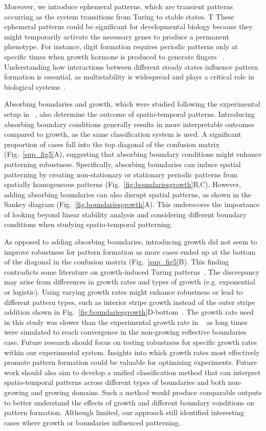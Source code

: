 Moreover, we introduce ephemeral patterns, which are transient patterns occurring as the system transitions from Turing to stable states.
T These ephemeral patterns could be significant for developmental biology because they might temporarily activate the necessary genes to produce a permanent phenotype.
For instance, digit formation requires periodic patterns only at specific times when growth hormone is produced to generate fingers ~\parencite{raspopovic2014digit}.
Understanding how interactions between different steady states influence pattern formation is essential, as multistability is widespread and plays a critical role in biological systems~\parencite{laurent1999multistability}.

 Absorbing boundaries and growth, which were studied following the experimental setup in ~\parencite{Oliver2023}, also determine the outcome of spatio-temporal patterns.
Introducing absorbing boundary conditions generally results in more interpretable outcomes compared to growth, as the same classification system is used.
A significant proportion of cases fall into the top diagonal of the confusion matrix (Fig.~\ref{sup_fig5}A), suggesting that absorbing boundary conditions might enhance patterning robustness.
Specifically, absorbing boundaries can induce spatial patterning by creating non-stationary or stationary periodic patterns from spatially homogeneous patterns (Fig.~\ref{fig:boundariesgrowth}B,C).
However, adding absorbing boundaries can also disrupt spatial patterns, as shown in the Sankey diagram (Fig.~\ref{fig:boundariesgrowth}A).
This underscores the importance of looking beyond linear stability analysis and considering different boundary conditions when studying spatio-temporal patterning.

As opposed to adding absorbing boundaries, introducing growth did not seem to improve robustness for pattern formation as more cases ended up at the bottom of the diagonal in the confusion matrix (Fig.~\ref{sup_fig5}B).
This finding contradicts some literature on growth-induced Turing patterns~\parencite{gaffney2010}.
The discrepancy may arise from differences in growth rates and types of growth (e.g. exponential or logistic).
Using varying growth rates might enhance robustness or lead to different pattern types, such as interior stripe growth instead of the outer stripe addition shown in Fig.~\ref{fig:boundariesgrowth}D-bottom~\parencite{konow2019turing}.
The growth rate used in this study was slower than the experimental growth rate in ~\parencite{Oliver2023} as long times were simulated to reach convergence in the non-growing reflective boundaries case.
Future research should focus on testing robustness for specific growth rates within our experimental system.
Insights into which growth rates most effectively promote pattern formation could be valuable for optimizing experiments.
Future work should also aim to develop a unified classification method that can interpret spatio-temporal patterns across different types of boundaries and both non-growing and growing domains.
Such a method would produce comparable outputs to better understand the effects of growth and different boundary conditions on pattern formation.
Although limited, our approach still identified interesting cases where growth or boundaries influenced patterning.
